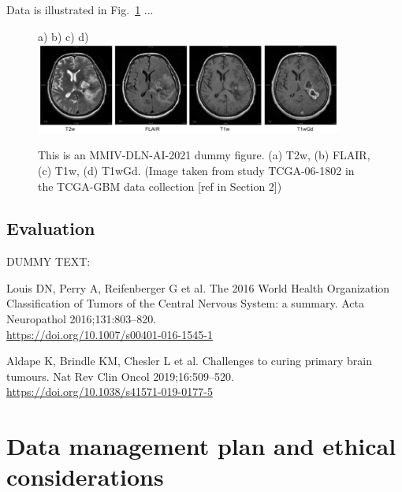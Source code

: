 \documentclass[11pt]{article}
\begin{document}
Data is illustrated in Fig.~\ref{fig:mmiv-dln-ai-2021-dummy} ...

\begin{figure}[H]
a)  \hspace{32mm} b) \hspace{32mm}  c) \hspace{32mm}  d) \\
\includegraphics[width=0.9\textwidth]{mmiv-dln-ai-2021_dummy_fig.png}
\caption{This is an MMIV-DLN-AI-2021 dummy figure. (a) T2w, (b) FLAIR, (c) T1w, (d) T1wGd. (Image taken from study TCGA-06-1802 in the TCGA-GBM data collection [ref \cite{TCGA-GBM} in Section 2])}
\label{fig:mmiv-dln-ai-2021-dummy}
\end{figure}



\subsection{Evaluation}

DUMMY TEXT:
\lipsum[7]


\begin{footnotesize}
\begin{thebibliography}{14} 

 Louis DN, Perry A, Reifenberger G  et al. The 2016 World Health Organization Classification of Tumors of the Central Nervous System: a summary. Acta Neuropathol 2016;131:803–820.\\ \scriptsize{\url{https://doi.org/10.1007/s00401-016-1545-1}}

 Aldape K, Brindle KM, Chesler L et al. Challenges to curing primary brain tumours. Nat Rev Clin Oncol 2019;16:509–520.\\ \scriptsize{\url{https://doi.org/10.1038/s41571-019-0177-5}}


\end{thebibliography}
\end{footnotesize}

\newpage

\section{Data management plan and ethical considerations}
\end{document}

